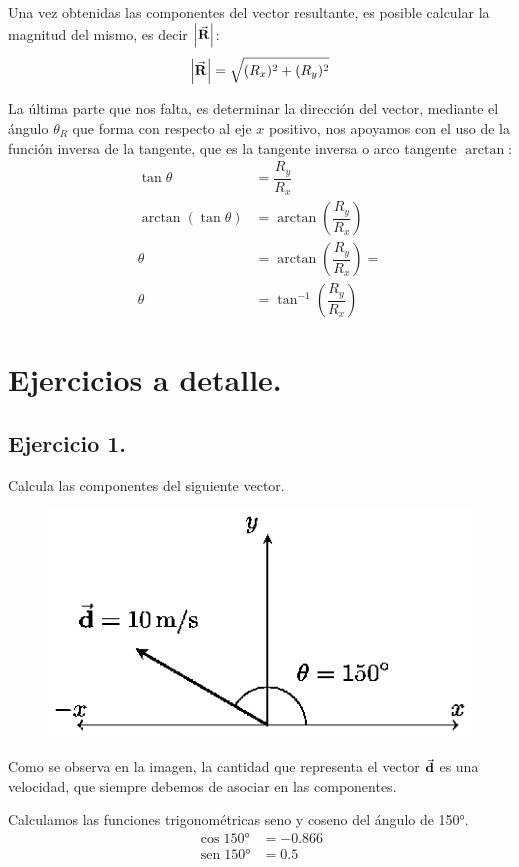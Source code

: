 \documentclass[14pt]{extarticle}
\renewcommand{\sin}{\operatorname{sen}}
\begin{document}
Una vez obtenidas las componentes del vector resultante,  es posible calcular la magnitud del mismo, es decir $\abs{\va{R}}$:
\begin{align*}
\abs{\va{R}} = \sqrt{(R_{x})^{2} + (R_{y})^{2}}
\end{align*}

La última parte que nos falta, es determinar la dirección del vector, mediante el ángulo $\theta_{R}$ que forma con respecto al eje $x$ positivo, nos apoyamos con el uso de la función inversa de la tangente, que es la tangente inversa o arco tangente $\arctan$:
\begin{align*}
\tan \theta &= \dfrac{R_{y}}{R_{x}} \\[0.3em] 
\arctan(\tan \theta) &= \arctan(\dfrac{R_{y}}{R_{x}}) \\[0.5em] 
\theta &= \arctan(\dfrac{R_{y}}{R_{x}}) = \\[0.5em] 
\theta &= \tan^{-1} \left( \dfrac{R_{y}}{R_{x}} \right)
\end{align*}

\section*{Ejercicios a detalle.}

\subsection{Ejercicio 1.}

Calcula las componentes del siguiente vector.
\begin{figure}[H]
    \centering
    \includegraphics[scale=1.5]{Imagenes/Componentes_Vector_06.eps}
\end{figure}
Como se observa en la imagen, la cantidad que representa el vector $\va{d}$ es una velocidad, que siempre debemos de asociar en las componentes.

Calculamos las funciones trigonométricas seno y coseno del ángulo de \ang{150}.
\begin{align*}
\cos \ang{150} &= -0.866 \\[0.5em] 
\sin \ang{150} &= 0.5
\end{align*}
\end{document}
